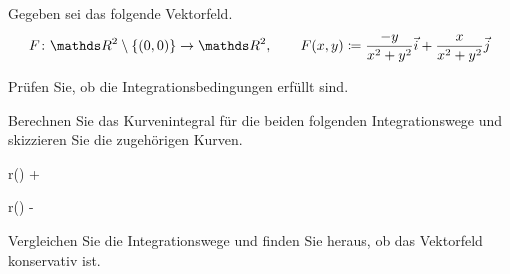 \begin{atiTask}[
  title = Magnetfeld eines Leiters
]
  Gegeben sei das folgende Vektorfeld.
  \[
    \function{F}{\setR^2\setminus\{(0,0)\}}{\setR^2}
    \separate
    F(x,y)\define \frac{-y}{x^2+y^2}\vec{i} + \frac{x}{x^2+y^2}\vec{j}
  \]
  \begin{atiSubtasks}
    \item{
      Prüfen Sie, ob die Integrationsbedingungen erfüllt sind.
    }
    \item{
      Berechnen Sie das Kurvenintegral für die beiden folgenden Integrationswege und skizzieren Sie die zugehörigen Kurven.
      \begin{atiSubequations}
        \item{
          \separate
          r(\varphi)  \cos\varphi {} + \sin\varphi {}
        }
        \item{
          \separate
          r(\varphi)  \cos\varphi {} - \sin\varphi {}
        }
      \end{atiSubequations}
    }
    \item{
      Vergleichen Sie die Integrationswege und finden Sie heraus, ob das Vektorfeld konservativ ist.
    }
  \end{atiSubtasks}
\end{atiTask}